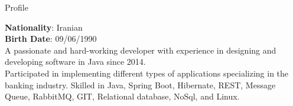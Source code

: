 
\begin{jrsection}[location = sidebar]{Profile}
    \begin{jrdescription}
        {\bfseries Nationality}: Iranian \\
        {\bfseries Birth Date}: 09/06/1990 \\
    A passionate and hard-working developer with experience in designing and developing software in Java since 2014.\\
    Participated in implementing different types of applications specializing in the banking industry.
    Skilled in Java, Spring Boot, Hibernate, REST, Message Queue, RabbitMQ, GIT, Relational database, NoSql, and Linux.
    \end{jrdescription}
\end{jrsection}
